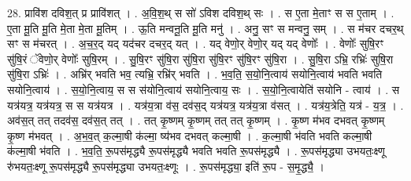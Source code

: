 \documentclass[17pt]{extarticle}
\begin{document}
28. प्रावि॑श दविश॒त् प्र प्रावि॑शत् । . अ॒वि॒श॒थ् स सो॑ ऽविश दविश॒थ् सः । . स ए॒ता मे॒ताꣳ स स ए॒ताम् । . ए॒ता मू॒ति मू॒ति मे॒ता मे॒ता मू॒तिम् । . ऊ॒ति मन्वनू॒ति मू॒ति मनु॑ । . अनु॒ सꣳ स मन्वनु॒ सम् । . स म॑चर दचर॒थ् सꣳ स म॑चरत् । . अ॒च॒र॒द् यद् यद॑चर दचर॒द् यत् । . यद् वेणो॒र् वेणो॒र् यद् यद् वेणोः᳚ । . वेणोः᳚ सुषि॒रꣳ सु॑षि॒रं ॅवेणो॒र् वेणोः᳚ सुषि॒रम् । . सु॒षि॒रꣳ सु॑षि॒रा सु॑षि॒रा सु॑षि॒रꣳ सु॑षि॒रꣳ सु॑षि॒रा । . सु॒षि॒रा ऽभ्रि॒ रभ्रिः॑ सुषि॒रा सु॑षि॒रा ऽभ्रिः॑ । . अभ्रि॑र् भवति भव॒ त्यभ्रि॒ रभ्रि॑र् भवति । . भ॒व॒ति॒ स॒यो॒नि॒त्वाय॑ सयोनि॒त्वाय॑ भवति भवति सयोनि॒त्वाय॑ । . स॒यो॒नि॒त्वाय॒ स स स॑योनि॒त्वाय॑ सयोनि॒त्वाय॒ सः । . स॒यो॒नि॒त्वायेति॑ सयोनि - त्वाय॑ । . स यत्र॑यत्र॒ यत्र॑यत्र॒ स स यत्र॑यत्र । . यत्र॑य॒त्रा व॑स॒ दव॑स॒द् यत्र॑यत्र॒ यत्र॑य॒त्रा व॑सत् । . यत्र॑य॒त्रेति॒ यत्र॑ - य॒त्र॒ । . अव॑स॒त् तत् तदव॑स॒ दव॑स॒त् तत् । . तत् कृ॒ष्णम् कृ॒ष्णम् तत् तत् कृ॒ष्णम् । . कृ॒ष्ण म॑भव दभवत् कृ॒ष्णम् कृ॒ष्ण म॑भवत् । . अ॒भ॒व॒त् क॒ल्मा॒षी क॑ल्मा॒ ष्य॑भव दभवत् कल्मा॒षी । . क॒ल्मा॒षी भ॑वति भवति कल्मा॒षी क॑ल्मा॒षी भ॑वति । . भ॒व॒ति॒ रू॒पस॑मृद्ध्यै रू॒पस॑मृद्ध्यै भवति भवति रू॒पस॑मृद्ध्यै । . रू॒पस॑मृद्ध्या उभयतः॒क्ष्णू रु॑भयतः॒क्ष्णू रू॒पस॑मृद्ध्यै रू॒पस॑मृद्ध्या उभयतः॒क्ष्णूः । . रू॒पस॑मृद्ध्या॒ इति॑ रू॒प - स॒मृ॒द्ध्यै॒ । \newline
\end{document}
